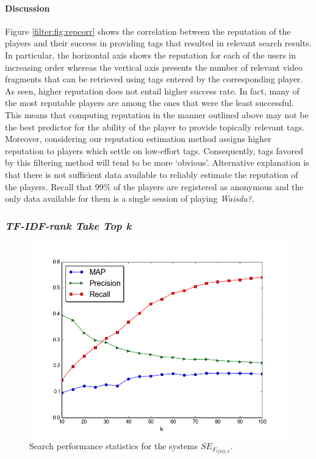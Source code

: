 \paragraph{Discussion} Figure \ref{filter:fig:repcorr} shows the correlation between the reputation of the players and their success in providing tags that resulted in relevant search results. In particular, the horizontal axis shows the reputation for each of the users in increasing order whereas the vertical axis presents the number of relevant video fragments that can be retrieved using tags entered by the corresponding player. As seen, higher reputation does not entail higher success rate. In fact, many of the most  reputable players are among the ones that were the least successful. This means that computing reputation in the manner outlined above may not be the best predictor for the ability of the player to provide topically relevant tags. 
Moreover, considering \cite{DBLP:conf/chi/RobertsonVW09,Jain:2013:GAE:2399187.2399190} our reputation estimation method assigns higher reputation to players which settle on low-effort tags. Consequently, tags favored by this filtering method will tend to be more `obvious'.
Alternative explanation is that there is not sufficient data available to reliably estimate the reputation of the players. Recall that 99\% of the players are registered as anonymous and the only data available for them is a single session of playing \textit{Waisda?}. 

\subsubsection{\textit{\textit{TF-IDF-rank Take Top k}}}

\begin{figure}
\centering
\includegraphics[scale=.4]{tfidfmets}
\caption{Search performance statistics for the systems $SE_{F_{tfidf,k}}$.}
\label{filter:fig:tfidfstats}
\end{figure}

